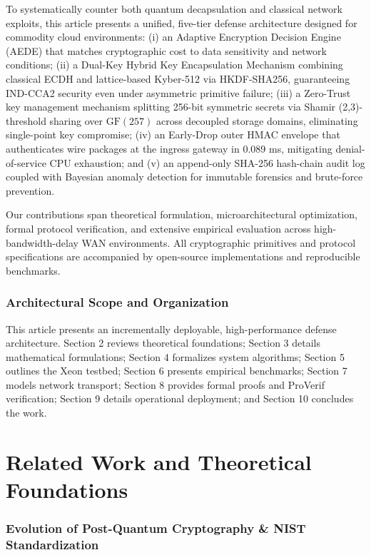\documentclass[5p,times]{elsarticle}
\begin{document}
To systematically counter both quantum decapsulation and classical network exploits, this article presents a unified, five-tier defense architecture designed for commodity cloud environments: (i) an Adaptive Encryption Decision Engine (AEDE) that matches cryptographic cost to data sensitivity and network conditions; (ii) a Dual-Key Hybrid Key Encapsulation Mechanism combining classical ECDH and lattice-based Kyber-512 via HKDF-SHA256, guaranteeing IND-CCA2 security even under asymmetric primitive failure; (iii) a Zero-Trust key management mechanism splitting 256-bit symmetric secrets via Shamir (2,3)-threshold sharing over $\text{GF}(257)$ across decoupled storage domains, eliminating single-point key compromise; (iv) an Early-Drop outer HMAC envelope that authenticates wire packages at the ingress gateway in 0.089 ms, mitigating denial-of-service CPU exhaustion; and (v) an append-only SHA-256 hash-chain audit log coupled with Bayesian anomaly detection for immutable forensics and brute-force prevention.

Our contributions span theoretical formulation, microarchitectural optimization, formal protocol verification, and extensive empirical evaluation across high-bandwidth-delay WAN environments. All cryptographic primitives and protocol specifications are accompanied by open-source implementations and reproducible benchmarks.


\subsubsection{Architectural Scope and Organization}

This article presents an incrementally deployable, high-performance defense architecture. Section 2 reviews theoretical foundations; Section 3 details mathematical formulations; Section 4 formalizes system algorithms; Section 5 outlines the Xeon testbed; Section 6 presents empirical benchmarks; Section 7 models network transport; Section 8 provides formal proofs and ProVerif verification; Section 9 details operational deployment; and Section 10 concludes the work.


\section{Related Work and Theoretical Foundations}


\subsubsection{Evolution of Post-Quantum Cryptography \& NIST Standardization}
\end{document}
